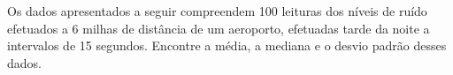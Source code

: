 Os dados apresentados a seguir compreendem 100 leituras dos níveis de ruído efetuados a 6 milhas de distância de um aeroporto, efetuadas tarde da noite a intervalos de 15 segundos. Encontre a média, a mediana e o desvio padrão desses dados.

